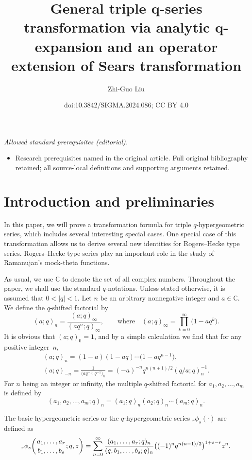 \documentclass[10pt,a4paper]{amsart}
\title{General triple q-series transformation via analytic q-expansion and an operator extension of Sears transformation}
\author{Zhi-Guo Liu}
\date{doi:10.3842/SIGMA.2024.086; CC BY 4.0}
\numberwithin{equation}{section}
\begin{document}
\maketitle
\noindent\textit{Allowed standard prerequisites (editorial).}\begin{itemize}
\item Research prerequisites named in the original article. Full original bibliography retained; all source-local definitions and supporting arguments retained.
\end{itemize}\medskip
\section{Introduction and preliminaries}

In this paper, we will prove a transformation formula for triple $q$-hypergeometric series, which includes several interesting special cases. One special case of this transformation allows us to derive several new identities for Rogers--Hecke type series. Rogers--Hecke type series play an important role in the study of Ramanujan's mock-theta functions.

As usual, we use $\mathbb{C}$ to denote the set of all complex numbers. Throughout the paper, we shall use the standard $q$-notations. Unless stated otherwise, it is assumed that $0<|q|<1$.
Let $n$ be an arbitrary nonnegative integer and $a \in \mathbb{C}$.
We define the $q$-shifted factorial by
\begin{equation*}
	(a;q)_n=\frac{(a; q)_\infty}{(aq^n; q)_\infty}, \qquad \text{where}\quad
	(a; q)_\infty=\prod_{k=0}^\infty \bigl(1-aq^k\bigr).
\end{equation*}
It is obvious that $(a; q)_0=1$, and by a simple calculation we find that for any positive integer~$n$,
\begin{gather*}
(a; q)_n=(1-a)(1-aq)\cdots \bigl(1-aq^{n-1}\bigr),\\
(a; q)_{-n}=\frac{1}{\bigl(aq^{-1}; q^{-1}\bigr)_n}=(-a)^{-n} q^{n(n+1)/2} (q/a; q)_n^{-1}.
\end{gather*}
For $n$ being an integer or infinity, the multiple
$q$-shifted factorial for $a_1, a_2, \ldots, a_m $ is defined by
\begin{equation*}
(a_1, a_2,\dots ,a_m;q)_n=(a_1;q)_n(a_2;q)_n \cdots (a_m;q)_n.
\end{equation*}

The basic hypergeometric series or the $q$-hypergeometric series ${_{r}\phi_s}(\cdot)$ are defined as
\begin{equation*}
_{r}\phi_s \biggl({{a_1, \ldots, a_{r}} \atop {b_1, \ldots,
b_s}} ; q, z \biggr) =\sum_{n=0}^\infty
\frac{(a_1, \ldots, a_r; q)_n}{(q, b_1, \ldots, b_s; q)_n}
\bigl((-1)^n q^{n(n-1)/2}\bigr)^{1+s-r}z^n.
\end{equation*}
\end{document}

